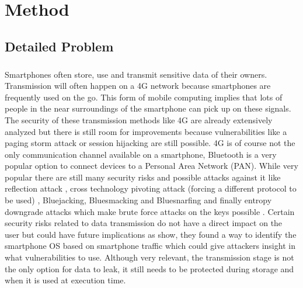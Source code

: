 \chapter{Method}

\section{Detailed Problem}

\paragraph*{}
Smartphones often store, use and transmit sensitive data of their owners. Transmission will often happen on a 4G network because smartphones are frequently used on the go. This form of mobile computing implies that lots of people in the near surroundings of the smartphone can pick up on these signals. The security of these transmission methods like 4G are already extensively analyzed \cite{FerragMohamedAmine2018Sf4a} \cite{ZakiRanaM20214NSA} \cite{JasimKhalidFadhil2022AoEA} but there is still room for improvements because vulnerabilities like a paging storm attack \cite{FangKaiming2020Psaa} or session hijacking \cite{LuYu-Han2020Gcfo} are still possible. 4G is of course not the only communication channel available on a smartphone, Bluetooth is a very popular option to connect devices to a Personal Area Network (PAN). While very popular there are still many security risks and possible attacks against it like reflection attack \cite{ClaverieTristan2021BRoB}, cross technology pivoting attack (forcing a different protocol to be used) \cite{CayreRomain2021CaWa}, Bluejacking, Bluesmacking and Bluesnarfing \cite{PatelNishitkumar2021IBVt} and finally entropy downgrade attacks which make brute force attacks on the keys possible \cite{AntonioliDaniele2020KNDA}. Certain security risks related to data transmission do not have a direct impact on the user but could have future implications as \cite{ZhuYe2021TSOS} show, they found a way to identify the smartphone OS based on smartphone traffic which could give attackers insight in what vulnerabilities to use. Although very relevant, the transmission stage is not the only option for data to leak, it still needs to be protected during storage and when it is used at execution time.


